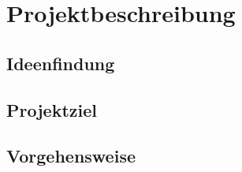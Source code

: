\chapter{Projektbeschreibung}\label{ch:projektbeschreibung}
\section{Ideenfindung}
\section{Projektziel}
\section{Vorgehensweise}
